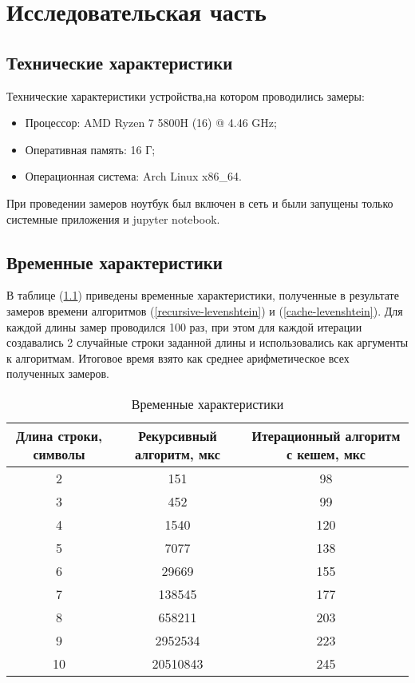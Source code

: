 \chapter{Исследовательская часть}

\section{Технические характеристики}

Технические характеристики устройства,на котором проводились замеры:

\begin{itemize}
	\item Процессор: AMD Ryzen 7 5800H (16) @ 4.46 GHz;
	\item Оперативная память: 16 Г;
	\item Операционная система: Arch Linux x86\_64.
\end{itemize}

При проведении замеров ноутбук был включен в сеть и были запущены только системные приложения и jupyter notebook.

\section{Временные характеристики}
В таблице (\ref{tbl:time_algo}) приведены временные характеристики, полученные в результате замеров времени алгоритмов (\ref{recursive-levenshtein}) и (\ref{cache-levenshtein}). Для каждой длины замер проводился 100 раз, при этом для каждой итерации создавались 2 случайные строки заданной длины и использовались как аргументы к алгоритмам. Итоговое время взято как среднее арифметическое всех полученных замеров.

\begin{table}[ht]
	\small
	\begin{center}
		\begin{threeparttable}
			\caption{Временные характеристики}
			\label{tbl:time_algo}
			\begin{tabular}{|c|c|c|}
				\hline
				Длина строки, символы & Рекурсивный алгоритм, мкс & Итерационный алгоритм с кешем, мкс \\
				\hline
				2 & 151  & 98  \\
				\hline
				3 & 452  & 99  \\
				\hline
				4 & 1540  & 120  \\
				\hline
				5 & 7077  & 138  \\
				\hline
				6 & 29669  & 155  \\
				\hline
				7 & 138545  & 177  \\
				\hline
				8 & 658211  & 203  \\
				\hline
				9 & 2952534  & 223  \\
				\hline
				10 & 20510843  & 245  \\
				\hline
			\end{tabular}	
		\end{threeparttable}
	\end{center}
\end{table}

